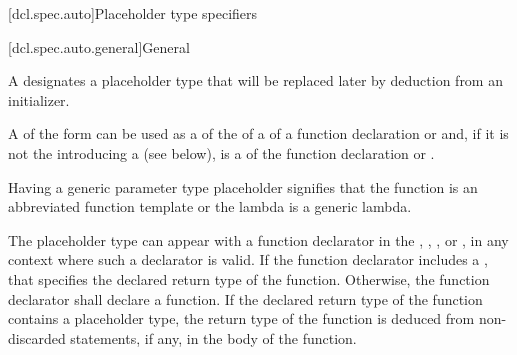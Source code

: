[dcl.spec.auto]{Placeholder type specifiers}%

[dcl.spec.auto.general]{General}%
%

\begin{bnf}
\br
   \br
    \terminal{(}  \terminal{)}
\end{bnf}

\pnum
A 
designates a placeholder type that will be replaced later by deduction
from an initializer.

\pnum
A  of the form
 
can be used as a  of
the  of
a  of
a function declaration or  and,
if it is not the  
introducing a  (see below),
is a 
of the function declaration or .
\begin{note}
Having a generic parameter type placeholder
signifies that the function is
an abbreviated function template or
the lambda is a generic lambda.
\end{note}

\pnum
The placeholder type can appear with a function declarator in the
, ,
, or ,
in any context where such a declarator is valid. If the function declarator
includes a , that
 specifies
the declared return type of the function. Otherwise, the function declarator
shall declare a function. If the declared return type of the
function contains a placeholder type, the return type of the function is
deduced from non-discarded  statements, if any, in the body
of the function.

